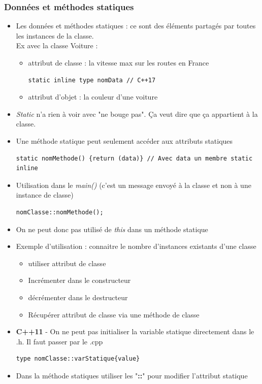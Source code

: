 \documentclass[12pt,a4paper]{article}
\begin{document}
\subsubsection{Données et méthodes statiques}
\begin{itemize}
\item Les données et méthodes statiques : ce sont des éléments partagés par toutes les instances de la classe.\\
Ex avec la classe Voiture :
\begin{itemize}
\item attribut de classe : la vitesse max sur les routes en France
\begin{lstlisting}
static inline type nomData // C++17
\end{lstlisting}
\item attribut d'objet : la couleur d'une voiture
\end{itemize}
\item \textit{Static} n'a rien à voir avec "ne bouge pas". Ça veut dire que ça appartient à la classe.
\item Une méthode statique peut seulement accéder aux attributs statiques
\begin{lstlisting}
static nomMethode() {return (data)} // Avec data un membre static inline
\end{lstlisting}
\item Utilisation dans le \textit{main()} (c'est un message envoyé à la classe et non à une instance de classe)
\begin{lstlisting}
nomClasse::nomMethode();
\end{lstlisting}
\item On ne peut donc pas utilisé de \textit{this} dans un méthode statique
\item Exemple d'utilisation : connaitre le nombre d'instances existants d'une classe
\begin{itemize}
\item utiliser attribut de classe
\item Incrémenter dans le constructeur
\item décrémenter dans le destructeur
\item Récupérer attribut de classe via une méthode de classe
\end{itemize}
\item \textbf{C++11} - On ne peut pas initialiser la variable statique directement dans le .h. Il faut passer par le .cpp
\begin{lstlisting}
type nomClasse::varStatique{value}
\end{lstlisting}
\item Dans la méthode statiques utiliser les "\textbf{::}" pour modifier l'attribut statique
\end{itemize}
\end{document}
